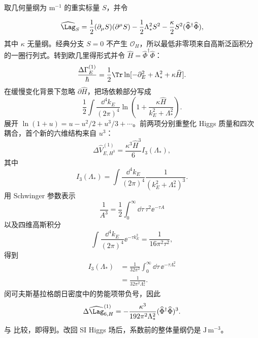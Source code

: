 \begin{derivation}[重标量消元的一圈有效算符]
取几何量纲为 $\mathrm{m^{-1}}$ 的重实标量 $S$，并令

\begin{equation*}
\widehat\Lag_S
=\frac12(\partial_\mu S)(\partial^\mu S)
-\frac12\Lambda_*^2S^2
-\frac\kappa2S^2(\widehat\Phi^\dagger\widehat\Phi),
\end{equation*}
其中 $\kappa$ 无量纲。经典分支 $S=0$ 不产生 $\mathcal O_H$，所以最低非零项来自高斯泛函积分的一圈行列式。转到欧几里得形式并令 $\widehat H=\widehat\Phi^\dagger\widehat\Phi$：
\begin{equation*}
\frac{\Delta\Gamma_E^{(1)}}{\hbar}
=\frac12\Tr\ln[-\partial_E^2+\Lambda_*^2+\kappa\widehat H].
\end{equation*}
在缓慢变化背景下忽略 $\partial\widehat H$，把场依赖部分写成
\begin{equation*}
\frac12\int\frac{\dd^4 k_E}{(2\pi)^4}
\ln\!\left(1+\frac{\kappa\widehat H}{k_E^2+\Lambda_*^2}\right).
\end{equation*}
展开 $\ln(1+u)=u-u^2/2+u^3/3+\cdots$。前两项分别重整化 Higgs 质量和四次耦合，首个新的六维结构来自 $u^3$：
\begin{equation*}
\Delta\widehat V_{E,H^3}^{(1)}
=\frac{\kappa^3\widehat H^3}{6}I_3(\Lambda_*),
\end{equation*}
其中
\begin{equation*}
I_3(\Lambda_*)
=\int\frac{\dd^4 k_E}{(2\pi)^4}\frac1{(k_E^2+\Lambda_*^2)^3}.
\end{equation*}
用 Schwinger 参数表示
\begin{equation*}
\frac1{A^3}=\frac12\int_0^\infty\dd\tau\,\tau^2\ee^{-\tau A}
\end{equation*}
以及四维高斯积分
\begin{equation*}
\int\frac{\dd^4 k_E}{(2\pi)^4}\ee^{-\tau k_E^2}
=\frac1{16\pi^2\tau^2},
\end{equation*}
得到
\begin{align*}
I_3(\Lambda_*)
&=\frac1{32\pi^2}\int_0^\infty\dd\tau\,\ee^{-\tau\Lambda_*^2}\\
&=\frac1{32\pi^2\Lambda_*^2}.
\end{align*}
闵可夫斯基拉格朗日密度中的势能项带负号，因此
\begin{equation*}
\Delta\widehat\Lag_{6,H}^{(1)}
=-\frac{\kappa^3}{192\pi^2\Lambda_*^2}
(\widehat\Phi^\dagger\widehat\Phi)^3.
\end{equation*}
与 比较，即得到。改回 SI Higgs 场后，系数前的整体量纲仍是 $\mathrm{J\,m^{-3}}$。
\end{derivation}

